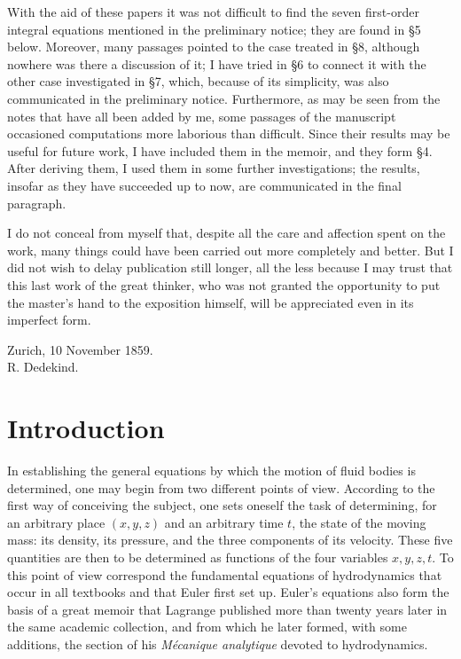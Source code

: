 \documentclass[11pt]{article}
\begin{document}
With the aid of these papers it was not difficult to find the seven first-order integral equations mentioned in the preliminary notice; they are found in \S5 below.  Moreover, many passages pointed to the case treated in \S8, although nowhere was there a discussion of it; I have tried in \S6 to connect it with the other case investigated in \S7, which, because of its simplicity, was also communicated in the preliminary notice.  Furthermore, as may be seen from the notes that have all been added by me, some passages of the manuscript occasioned computations more laborious than difficult.  Since their results may be useful for future work, I have included them in the memoir, and they form \S4.  After deriving them, I used them in some further investigations; the results, insofar as they have succeeded up to now, are communicated in the final paragraph.

I do not conceal from myself that, despite all the care and affection spent on the work, many things could have been carried out more completely and better.  But I did not wish to delay publication still longer, all the less because I may trust that this last work of the great thinker, who was not granted the opportunity to put the master's hand to the exposition himself, will be appreciated even in its imperfect form.

\begin{flushright}
Zurich, 10 November 1859.\\
R. Dedekind.
\end{flushright}

\section*{Introduction}

In establishing the general equations by which the motion of fluid bodies is determined, one may begin from two different points of view.  According to the first way of conceiving the subject, one sets oneself the task of determining, for an arbitrary place \((x,y,z)\) and an arbitrary time \(t\), the state of the moving mass: its density, its pressure, and the three components of its velocity.  These five quantities are then to be determined as functions of the four variables \(x,y,z,t\).  To this point of view correspond the fundamental equations of hydrodynamics that occur in all textbooks and that Euler first set up.  Euler's equations also form the basis of a great memoir that Lagrange published more than twenty years later in the same academic collection, and from which he later formed, with some additions, the section of his \emph{Mécanique analytique} devoted to hydrodynamics.
\end{document}
